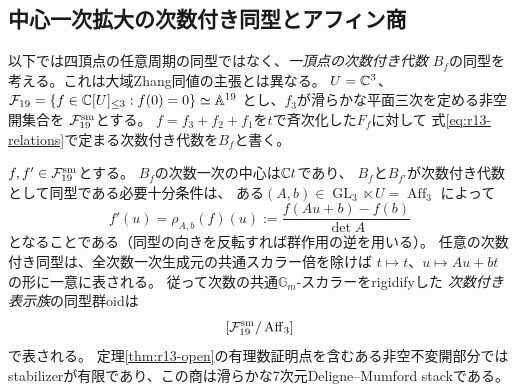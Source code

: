 \subsection{中心一次拡大の次数付き同型とアフィン商}
\label{sec:r13-affine-quotient}
以下では四頂点の任意周期の同型ではなく、\emph{一頂点の次数付き代数}
$B_f$の同型を考える。これは大域Zhang同値の主張とは異なる。
$U=\mathbb C^3$、$\mathcal F_{19}=\{f\in\mathbb C[U]_{\le3}:f(0)=0\}\simeq\mathbb A^{19}$
とし、$f_3$が滑らかな平面三次を定める非空開集合を
$\mathcal F_{19}^{\rm sm}$とする。
$f=f_3+f_2+f_1$を$t$で斉次化した$F_f$に対して
式\eqref{eq:r13-relations}で定まる次数付き代数を$B_f$と書く。

\begin{theorem}[R(1,3)中心拡大の次数付き同型]\label{thm:r13-affine}
$f,f'\in\mathcal F_{19}^{\rm sm}$とする。
$B_f$の次数一次の中心は$\mathbb C t$であり、
$B_f$と$B_{f'}$が次数付き代数として同型である必要十分条件は、
ある$(A,b)\in\operatorname{GL}_3\ltimes U=\operatorname{Aff}_3$
によって
\begin{equation}\label{eq:affine-action}
 f'(u)=\rho_{A,b}(f)(u):=
 \frac{f(Au+b)-f(b)}{\det A}
\end{equation}
となることである（同型の向きを反転すれば群作用の逆を用いる）。
任意の次数付き同型は、全次数一次生成元の共通スカラー倍を除けば
$t\mapsto t$、$u\mapsto Au+b t$の形に一意に表される。
従って次数の共通$\mathbb G_m$-スカラーをrigidifyした
\emph{次数付き表示族}の同型群oidは
\[
 [\mathcal F_{19}^{\rm sm}/\operatorname{Aff}_3]
\]
で表される。
定理\ref{thm:r13-open}の有理数証明点を含むある非空不変開部分では
stabilizerが有限であり、この商は滑らかな7次元Deligne--Mumford stackである。
\end{theorem}
